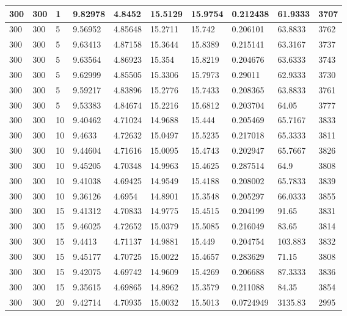 \begin{landscape}
\begin{longtable}{ | l | l | l | l | l | l | l | l | l | l | }
300 & 300 & 1 & 9.82978 & 4.8452 & 15.5129 & 15.9754 & 0.212438 & 61.9333 & 3707\\ \hline
300 & 300 & 5 & 9.56952 & 4.85648 & 15.2711 & 15.742 & 0.206101 & 63.8833 & 3762\\ \hline
300 & 300 & 5 & 9.63413 & 4.87158 & 15.3644 & 15.8389 & 0.215141 & 63.3167 & 3737\\ \hline
300 & 300 & 5 & 9.63564 & 4.86923 & 15.354 & 15.8219 & 0.204676 & 63.6333 & 3743\\ \hline
300 & 300 & 5 & 9.62999 & 4.85505 & 15.3306 & 15.7973 & 0.29011 & 62.9333 & 3730\\ \hline
300 & 300 & 5 & 9.59217 & 4.83896 & 15.2776 & 15.7433 & 0.208365 & 63.8833 & 3761\\ \hline
300 & 300 & 5 & 9.53383 & 4.84674 & 15.2216 & 15.6812 & 0.203704 & 64.05 & 3777\\ \hline
300 & 300 & 10 & 9.40462 & 4.71024 & 14.9688 & 15.444 & 0.205469 & 65.7167 & 3833\\ \hline
300 & 300 & 10 & 9.4633 & 4.72632 & 15.0497 & 15.5235 & 0.217018 & 65.3333 & 3811\\ \hline
300 & 300 & 10 & 9.44604 & 4.71616 & 15.0095 & 15.4743 & 0.202947 & 65.7667 & 3826\\ \hline
300 & 300 & 10 & 9.45205 & 4.70348 & 14.9963 & 15.4625 & 0.287514 & 64.9 & 3808\\ \hline
300 & 300 & 10 & 9.41038 & 4.69425 & 14.9549 & 15.4188 & 0.208002 & 65.7833 & 3839\\ \hline
300 & 300 & 10 & 9.36126 & 4.6954 & 14.8901 & 15.3548 & 0.205297 & 66.0333 & 3855\\ \hline
300 & 300 & 15 & 9.41312 & 4.70833 & 14.9775 & 15.4515 & 0.204199 & 91.65 & 3831\\ \hline
300 & 300 & 15 & 9.46025 & 4.72652 & 15.0379 & 15.5085 & 0.216049 & 83.65 & 3814\\ \hline
300 & 300 & 15 & 9.4413 & 4.71137 & 14.9881 & 15.449 & 0.204754 & 103.883 & 3832\\ \hline
300 & 300 & 15 & 9.45177 & 4.70725 & 15.0022 & 15.4657 & 0.283629 & 71.15 & 3808\\ \hline
300 & 300 & 15 & 9.42075 & 4.69742 & 14.9609 & 15.4269 & 0.206688 & 87.3333 & 3836\\ \hline
300 & 300 & 15 & 9.35615 & 4.69865 & 14.8962 & 15.3579 & 0.211088 & 84.35 & 3854\\ \hline
300 & 300 & 20 & 9.42714 & 4.70935 & 15.0032 & 15.5013 & 0.0724949 & 3135.83 & 2995\\ \hline

\end{longtable}
\end{landscape}
